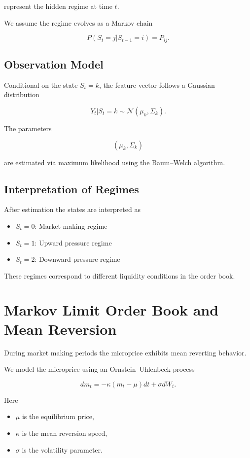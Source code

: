 \documentclass[11pt]{article}
\begin{document}
represent the hidden regime at time $t$.

We assume the regime evolves as a Markov chain

\[
P(S_t=j|S_{t-1}=i) = P_{ij}.
\]

\subsection{Observation Model}

Conditional on the state $S_t=k$, the feature vector follows a Gaussian distribution

\[
Y_t | S_t=k \sim
\mathcal{N}(\mu_k,\Sigma_k).
\]

The parameters

\[
(\mu_k,\Sigma_k)
\]

are estimated via maximum likelihood using the Baum--Welch algorithm.

\subsection{Interpretation of Regimes}

After estimation the states are interpreted as

\begin{itemize}
\item $S_t=0$: Market making regime
\item $S_t=1$: Upward pressure regime
\item $S_t=2$: Downward pressure regime
\end{itemize}

These regimes correspond to different liquidity conditions in the order book.

\section{Markov Limit Order Book and Mean Reversion}

During market making periods the microprice exhibits mean reverting behavior.

We model the microprice using an Ornstein--Uhlenbeck process

\[
dm_t = -\kappa(m_t-\mu)dt + \sigma dW_t.
\]

Here

\begin{itemize}
\item $\mu$ is the equilibrium price,
\item $\kappa$ is the mean reversion speed,
\item $\sigma$ is the volatility parameter.
\end{itemize}
\end{document}
